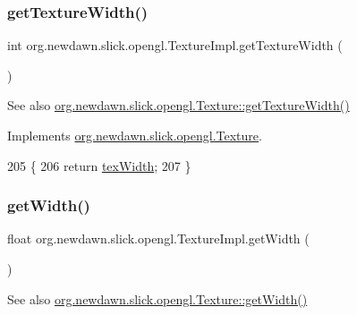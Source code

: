 \subsubsection{\texorpdfstring{get\+Texture\+Width()}{getTextureWidth()}}
{\footnotesize\ttfamily int org.\+newdawn.\+slick.\+opengl.\+Texture\+Impl.\+get\+Texture\+Width (\begin{DoxyParamCaption}{ }\end{DoxyParamCaption})\hspace{0.3cm}{\ttfamily [inline]}}

\begin{DoxySeeAlso}{See also}
\mbox{\hyperlink{interfaceorg_1_1newdawn_1_1slick_1_1opengl_1_1_texture_aa85f8503feafc2f18472a4deb2a67b4e}{org.\+newdawn.\+slick.\+opengl.\+Texture\+::get\+Texture\+Width()}} 
\end{DoxySeeAlso}


Implements \mbox{\hyperlink{interfaceorg_1_1newdawn_1_1slick_1_1opengl_1_1_texture_aa85f8503feafc2f18472a4deb2a67b4e}{org.\+newdawn.\+slick.\+opengl.\+Texture}}.


\begin{DoxyCode}
205                                  \{
206         \textcolor{keywordflow}{return} \mbox{\hyperlink{classorg_1_1newdawn_1_1slick_1_1opengl_1_1_texture_impl_acb22083c60049df21f8e484413d73212}{texWidth}};
207     \}
\end{DoxyCode}
\mbox{\label{classorg_1_1newdawn_1_1slick_1_1opengl_1_1_texture_impl_afd6ce11ac31f73cd143d6f609a4358f4}} 
\subsubsection{\texorpdfstring{get\+Width()}{getWidth()}}
{\footnotesize\ttfamily float org.\+newdawn.\+slick.\+opengl.\+Texture\+Impl.\+get\+Width (\begin{DoxyParamCaption}{ }\end{DoxyParamCaption})\hspace{0.3cm}{\ttfamily [inline]}}

\begin{DoxySeeAlso}{See also}
\mbox{\hyperlink{interfaceorg_1_1newdawn_1_1slick_1_1opengl_1_1_texture_a9a4e474e98451e2fe3cf5bedc8fc5910}{org.\+newdawn.\+slick.\+opengl.\+Texture\+::get\+Width()}} 
\end{DoxySeeAlso}


